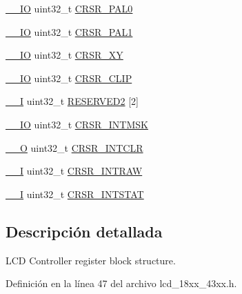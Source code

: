 \begin{DoxyCompactItemize}
\hyperlink{core__sc300_8h_aec43007d9998a0a0e01faede4133d6be}{\+\_\+\+\_\+\+IO} uint32\+\_\+t \hyperlink{struct_l_p_c___l_c_d___t_a4acff3d59c7a09e4b8ce002b7c1d56c9}{C\+R\+S\+R\+\_\+\+P\+A\+L0}
\item 
\hyperlink{core__sc300_8h_aec43007d9998a0a0e01faede4133d6be}{\+\_\+\+\_\+\+IO} uint32\+\_\+t \hyperlink{struct_l_p_c___l_c_d___t_aca2b888a5b0941d9ef4f577cf3afe39b}{C\+R\+S\+R\+\_\+\+P\+A\+L1}
\item 
\hyperlink{core__sc300_8h_aec43007d9998a0a0e01faede4133d6be}{\+\_\+\+\_\+\+IO} uint32\+\_\+t \hyperlink{struct_l_p_c___l_c_d___t_a7d9acf06c82a82ca29a1fe68e13e7023}{C\+R\+S\+R\+\_\+\+XY}
\item 
\hyperlink{core__sc300_8h_aec43007d9998a0a0e01faede4133d6be}{\+\_\+\+\_\+\+IO} uint32\+\_\+t \hyperlink{struct_l_p_c___l_c_d___t_a5d2648ef26085c34f0898113ef0361a5}{C\+R\+S\+R\+\_\+\+C\+L\+IP}
\item 
\hyperlink{core__sc300_8h_af63697ed9952cc71e1225efe205f6cd3}{\+\_\+\+\_\+I} uint32\+\_\+t \hyperlink{struct_l_p_c___l_c_d___t_a9c89d8514e7f2732c6cb573cd4602af2}{R\+E\+S\+E\+R\+V\+E\+D2} \mbox{[}2\mbox{]}
\item 
\hyperlink{core__sc300_8h_aec43007d9998a0a0e01faede4133d6be}{\+\_\+\+\_\+\+IO} uint32\+\_\+t \hyperlink{struct_l_p_c___l_c_d___t_ae78f57d6d6b02fe9759d20be63a18093}{C\+R\+S\+R\+\_\+\+I\+N\+T\+M\+SK}
\item 
\hyperlink{core__sc300_8h_a7e25d9380f9ef903923964322e71f2f6}{\+\_\+\+\_\+O} uint32\+\_\+t \hyperlink{struct_l_p_c___l_c_d___t_a7012f2efd7683bb749ff1a094d2317ff}{C\+R\+S\+R\+\_\+\+I\+N\+T\+C\+LR}
\item 
\hyperlink{core__sc300_8h_af63697ed9952cc71e1225efe205f6cd3}{\+\_\+\+\_\+I} uint32\+\_\+t \hyperlink{struct_l_p_c___l_c_d___t_a874b3ea8395c0fc025398db46000936f}{C\+R\+S\+R\+\_\+\+I\+N\+T\+R\+AW}
\item 
\hyperlink{core__sc300_8h_af63697ed9952cc71e1225efe205f6cd3}{\+\_\+\+\_\+I} uint32\+\_\+t \hyperlink{struct_l_p_c___l_c_d___t_a3d40adb157e838d22ac5ab6b70705199}{C\+R\+S\+R\+\_\+\+I\+N\+T\+S\+T\+AT}
\end{DoxyCompactItemize}


\subsection{Descripción detallada}
L\+CD Controller register block structure. 

Definición en la línea 47 del archivo lcd\+\_\+18xx\+\_\+43xx.\+h.



